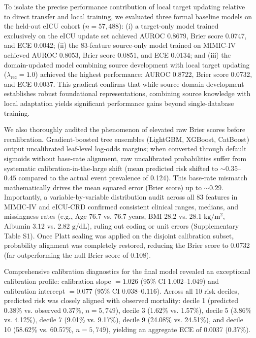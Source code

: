\documentclass[utf8]{FrontiersinVancouver}
\newcommand{\re}[1]{#1}
\begin{document}
\re{To isolate the precise performance contribution of local target updating relative to direct transfer and local training, we evaluated three formal baseline models on the held-out eICU cohort ($n=57,488$): (i) a target-only model trained exclusively on the eICU update set achieved AUROC 0.8679, Brier score 0.0747, and ECE 0.0042; (ii) the 83-feature source-only model trained on MIMIC-IV achieved AUROC 0.8053, Brier score 0.0851, and ECE 0.0134; and (iii) the domain-updated model combining source development with local target updating ($\lambda_{\mathrm{rec}}=1.0$) achieved the highest performance: AUROC 0.8722, Brier score 0.0732, and ECE 0.0037. This gradient confirms that while source-domain development establishes robust foundational representations, combining source knowledge with local adaptation yields significant performance gains beyond single-database training.}

\re{We also thoroughly audited the phenomenon of elevated raw Brier scores before recalibration. Gradient-boosted tree ensembles (LightGBM, XGBoost, CatBoost) output uncalibrated leaf-level log-odds margins; when converted through default sigmoids without base-rate alignment, raw uncalibrated probabilities suffer from systematic calibration-in-the-large shift (mean predicted risk shifted to $\sim 0.35$--$0.45$ compared to the actual event prevalence of 0.124). This base-rate mismatch mathematically drives the mean squared error (Brier score) up to $\sim 0.29$. Importantly, a variable-by-variable distribution audit across all 83 features in MIMIC-IV and eICU-CRD confirmed consistent clinical ranges, medians, and missingness rates (e.g., Age 76.7 vs. 76.7 years, BMI 28.2 vs. 28.1 $\mathrm{kg/m^2}$, Albumin 3.12 vs. 2.82 $\mathrm{g/dL}$), ruling out coding or unit errors (Supplementary Table S1). Once Platt scaling was applied on the disjoint calibration subset, probability alignment was completely restored, reducing the Brier score to 0.0732 (far outperforming the null Brier score of 0.108).}

\re{Comprehensive calibration diagnostics for the final model revealed an exceptional calibration profile: calibration slope $= 1.026$ (95\% CI 1.002--1.049) and calibration intercept $= 0.077$ (95\% CI 0.038--0.116). Across all 10 risk deciles, predicted risk was closely aligned with observed mortality: decile 1 (predicted 0.38\% vs. observed 0.37\%, $n=5,749$), decile 3 (1.62\% vs. 1.57\%), decile 5 (3.86\% vs. 4.12\%), decile 7 (9.01\% vs. 9.17\%), decile 9 (24.08\% vs. 24.51\%), and decile 10 (58.62\% vs. 60.57\%, $n=5,749$), yielding an aggregate ECE of 0.0037 (0.37\%).}
\end{document}
